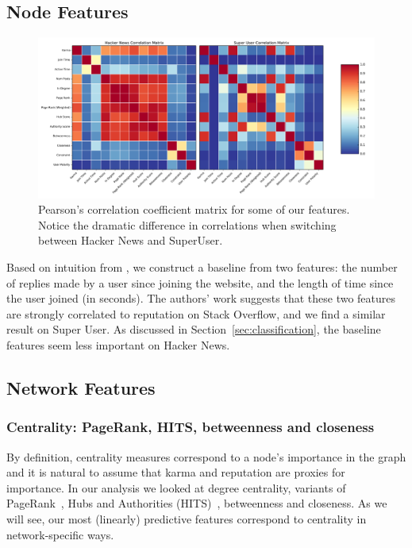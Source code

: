 \documentclass[11pt]{article}
\begin{document}
\subsection{Node Features}
\begin{figure}[t]
\centering

\includegraphics[width=\linewidth]{correlation-png}
\caption{Pearson's correlation coefficient matrix for some of our features.
Notice the dramatic difference in correlations when switching between 
Hacker News and SuperUser.}
\label{fig:correlation}
\end{figure}
Based on intuition from \citet{movshovitzanalysis}, we construct a baseline
from two features: the number of replies made by a user since joining the website,
and the length of time since the user joined (in seconds). The authors' work
suggests that these two features are strongly correlated to reputation on Stack
Overflow, and we find a similar result on Super User. As discussed in 
Section~\ref{sec:classification}, the baseline features seem less 
important on Hacker News.

\subsection{Network Features}

\subsubsection{Centrality: PageRank, HITS, betweenness and closeness}
\label{sec:centrality}

By definition, centrality measures correspond to a node's importance in the
graph and it is natural to assume that karma and reputation are proxies for
importance. In our analysis we looked at degree centrality, variants of
PageRank~\cite{page1999pagerank}, Hubs and Authorities
(HITS)~\cite{kleinberg1999authoritative}, betweenness and closeness. As we will
see, our most (linearly) predictive features correspond to centrality in
network-specific ways.
\end{document}
